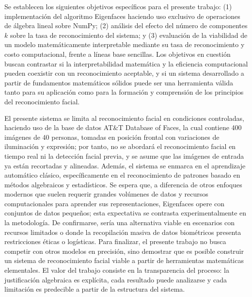 Se establecen los siguientes objetivos específicos para el presente trabajo:
(1) implementación del algoritmo Eigenfaces haciendo uso exclusivo de operaciones
de álgebra lineal sobre NumPy;
(2) análisis del efecto del número de componentes $k$ sobre la tasa de reconocimiento
del sistema; y
(3) evaluación de la viabilidad de un modelo matemáticamente interpretable mediante
su tasa de reconocimiento y costo computacional, frente a líneas base sencillas.
Los objetivos en cuestión buscan contrastar si la interpretabilidad matemática y la
eficiencia computacional pueden coexistir con un reconocimiento aceptable, y si un
sistema desarrollado a partir de fundamentos matemáticos sólidos puede ser una
herramienta válida tanto para su aplicación como para la formación y comprensión de
los principios del reconocimiento facial.

El presente sistema se limita al reconocimiento facial en condiciones controladas,
haciendo uso de la base de datos AT\&T Database of Faces, la cual contiene 400 imágenes
de 40 personas, tomadas en posición frontal con variaciones de iluminación y
expresión; por tanto, no se abordará el reconocimiento facial en tiempo real ni la
detección facial previa, y se asume que las imágenes de entrada ya están recortadas y
alineadas.
Además, el sistema se enmarca en el aprendizaje automático clásico, específicamente en
el reconocimiento de patrones basado en métodos algebraicos y estadísticos. Se espera
que, a diferencia de otros enfoques modernos que suelen requerir grandes volúmenes de
datos y recursos computacionales para aprender sus representaciones, Eigenfaces opere
con conjuntos de datos pequeños; esta expectativa se contrasta experimentalmente en la
metodología. De confirmarse, sería una alternativa viable en escenarios con recursos
limitados o donde la recopilación masiva de datos biométricos presenta restricciones
éticas o logísticas.
Para finalizar, el presente trabajo no busca competir con otros modelos en precisión,
sino demostrar que es posible construir un sistema de reconocimiento facial viable a
partir de herramientas matemáticas elementales. El valor del trabajo consiste en la
transparencia del proceso: la justificación algebraica es explícita, cada resultado
puede analizarse y cada limitación es predecible a partir de la estructura del sistema.